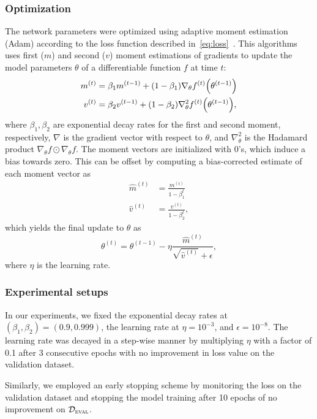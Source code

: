 \subsubsection{Optimization}
The network parameters were optimized using adaptive moment estimation (Adam) according to the loss function described in~\cref{eq:loss}~\cite{Kingma2015}.
This algorithms uses first ($m$) and second ($v$) moment estimations of gradients to update the model parameters $\theta$ of a differentiable function $f$ at time $t$:
\begin{align}
    m^{(t)} &= \beta_1 m^{(t-1)} + \parentheses*{ 1 - \beta_1 } \func{\nabla_\theta f^{(t)}}{\theta^{(t-1)}} \\
    v^{(t)} &= \beta_2 v^{(t-1)} + \parentheses*{ 1 - \beta_2 } \func{\nabla^2_\theta f^{(t)}}{\theta^{(t-1)}},
\end{align}
where $\beta_1, \beta_2$ are exponential decay rates for the first and second moment, respectively, $\nabla$ is the gradient vector with respect to $\theta$, and $\nabla^2_\theta$ is the Hadamard product \(\nabla_\theta f \odot \nabla_\theta f\).
The moment vectors are initialized with \(0\)'s, which induce a bias towards zero.
This can be offset by computing a bias-corrected estimate of each moment vector as
\begin{align}
    \hat{m}^{(t)} &= \frac{m^{(t)}}{1 - \beta^t_1} \\
    \hat{v}^{(t)} &= \frac{v^{(t)}}{1 - \beta^t_2},
\end{align}
which yields the final update to \(\theta\) as
\begin{equation}
    \theta^{(t)} = \theta^{(t-1)} - \eta \frac{\hat{m}^{(t)}}{\sqrt{\hat{v}^{(t)}} + \epsilon},
\end{equation}
where \(\eta\) is the learning rate.

\subsubsection{Experimental setups}
In our experiments, we fixed the exponential decay rates at \((\beta_1, \beta_2) = (0.9, 0.999)\), the learning rate at \(\eta = 10^{-3}\), and \(\epsilon = 10^{-8}\).
The learning rate was decayed in a step-wise manner by multiplying \( \eta \) with a factor of 0.1 after 3 consecutive epochs with no improvement in loss value on the validation dataset.

Similarly, we employed an early stopping scheme by monitoring the loss on the validation dataset and stopping the model training after 10 epochs of no improvement on \(\mathcal{D}_\textsc{eval}\).

